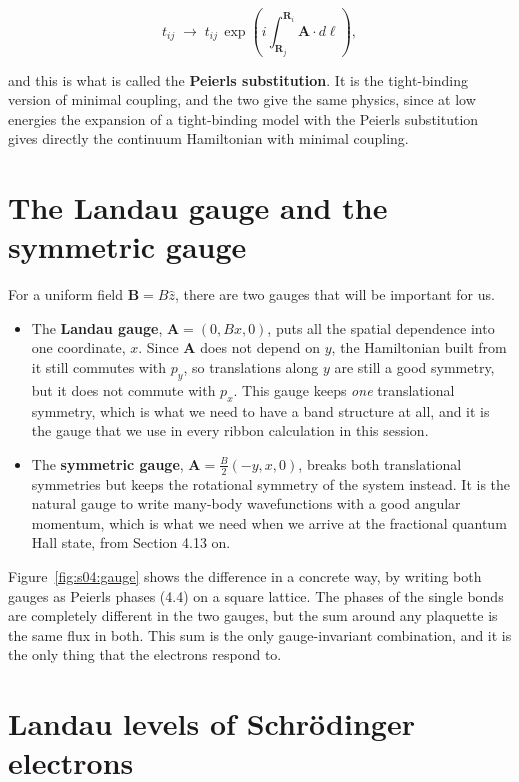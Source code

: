 \begin{equation}
t_{ij} \;\longrightarrow\; t_{ij}\, \exp\!\left(i\int_{\mathbf{R}_j}^{\mathbf{R}_i} \mathbf{A}\cdot d\boldsymbol{\ell}\right),
\end{equation}

and this is what is called the \textbf{Peierls substitution}. It is the tight-binding version of
minimal coupling, and the two give the same physics, since at low energies the expansion of a
tight-binding model with the Peierls substitution gives directly the continuum Hamiltonian with
minimal coupling.

\section{The Landau gauge and the symmetric gauge}

For a uniform field $\mathbf{B} = B\hat{z}$, there are two gauges that will be important for us.

\begin{itemize}
\item The \textbf{Landau gauge}, $\mathbf{A} = (0, Bx, 0)$, puts all the spatial dependence into
  one coordinate, $x$. Since $\mathbf{A}$ does not depend on $y$, the Hamiltonian built from it
  still commutes with $p_y$, so translations along $y$ are still a good symmetry, but it does not
  commute with $p_x$. This gauge keeps \emph{one} translational symmetry, which is what we need to
  have a band structure at all, and it is the gauge that we use in every ribbon calculation in this
  session.
\item The \textbf{symmetric gauge}, $\mathbf{A} = \tfrac{B}{2}(-y, x, 0)$, breaks both
  translational symmetries but keeps the rotational symmetry of the system instead. It is the
  natural gauge to write many-body wavefunctions with a good angular momentum, which is what we
  need when we arrive at the fractional quantum Hall state, from Section 4.13 on.
\end{itemize}

Figure~\ref{fig:s04:gauge} shows the difference in a concrete way, by writing both gauges as
Peierls phases (4.4) on a square lattice. The phases of the single bonds are completely different
in the two gauges, but the sum around any plaquette is the same flux in both. This sum is the only
gauge-invariant combination, and it is the only thing that the electrons respond to.



\section{Landau levels of Schrödinger electrons}

